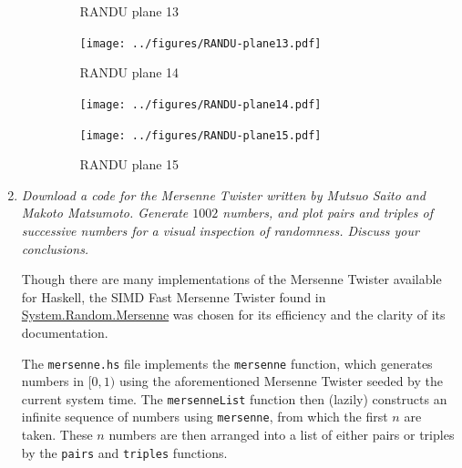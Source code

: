 \documentclass{article}
\begin{document}
\begin{enumerate}
\begin{enumerate}
\begin{figure}[H]
                    \centering
                    \begin{minipage}{.3\textwidth}
                        \centering
                        \caption{RANDU plane 13}
                        \texttt{[image: ../figures/RANDU-plane13.pdf]}
                    \end{minipage}
                    \begin{minipage}{.3\textwidth}
                        \centering
                        \caption{RANDU plane 14}
                        \texttt{[image: ../figures/RANDU-plane14.pdf]}
                    \end{minipage}
                    \begin{minipage}{.3\textwidth}
                        \centering
                        \caption{RANDU plane 15}
                        \texttt{[image: ../figures/RANDU-plane15.pdf]}
                    \end{minipage}
                \end{figure}
        \end{enumerate}
    \item
        {\it Download a code for the Mersenne Twister written by Mutsuo Saito and Makoto Matsumoto.
        Generate $1002$ numbers, and plot pairs and triples of successive numbers for a visual inspection of randomness. Discuss your conclusions.}

        Though there are many implementations of the Mersenne Twister available for Haskell,
        the SIMD Fast Mersenne Twister found in \href{https://hackage.haskell.org/package/mersenne-random}{System.Random.Mersenne}
        was chosen for its efficiency and the clarity of its documentation.

        The \texttt{mersenne.hs} file implements the \texttt{mersenne} function,
        which generates numbers in $[0, 1)$ using the aforementioned Mersenne Twister seeded by the current system time.
        The \texttt{mersenneList} function then (lazily) constructs an infinite sequence of numbers using \texttt{mersenne}, from which the first $n$ are taken.
        These $n$ numbers are then arranged into a list of either pairs or triples by the \texttt{pairs} and \texttt{triples} functions.


\end{enumerate}
\end{document}
